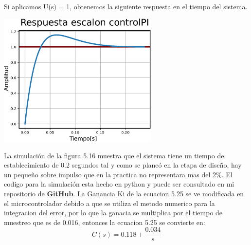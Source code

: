 Si aplicamos U(s) = 1, obtenemos la siguiente respuesta en el tiempo del sistema. 
\begin{center}
	\includegraphics[width=0.6\textwidth]{Contenido/Cuerpo/Capitulo5/Fig38.eps}
	\label{Fig4}
\end{center}
La simulación de la figura 5.16 muestra que el sistema tiene un tiempo de establecimiento de 0.2 segundos tal y como se 
planeó en la etapa de diseño, hay un pequeño sobre impulso que en la practica no representara mas del 2\%. El codigo para 
la simulación esta hecho en python y puede ser consultado en mi repositorio de \href{https://github.com/MarcoAAG/Tesis}{\textbf{GitHub}}.
La Ganancia Ki de la ecuacion 5.25 se ve modificada en el microcontrolador debido a que se utiliza el metodo numerico para la integracion del error, por lo que 
la ganacia se multiplica por el tiempo de muestreo que es de 0.016, entonces la ecuacion 5.25 se convierte en:
\begin{equation}
	C(s) = 0.118 + \frac{0.034}{s}
\end{equation}
